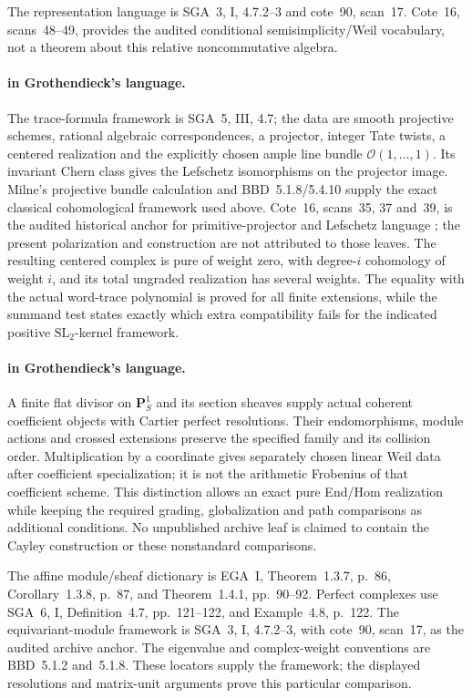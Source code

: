 The representation language is SGA~3, I, 4.7.2--3 and
cote~90, scan~17. Cote~16, scans~48--49, provides the
audited conditional semisimplicity/Weil vocabulary, not
a theorem about this relative noncommutative algebra.



\paragraph{ in Grothendieck's language.}
The trace-formula framework is SGA~5, III, 4.7; the data
are smooth projective schemes, rational algebraic
correspondences, a projector, integer Tate twists, a centered
realization and the explicitly chosen ample line bundle
$\mathcal O(1,\ldots,1)$. Its invariant Chern class gives the
Lefschetz isomorphisms on the projector image. Milne's projective
bundle calculation and BBD~5.1.8/5.4.10 supply the exact classical
cohomological framework used above. Cote~16, scans~35, 37 and~39,
is the audited historical anchor for primitive-projector and
Lefschetz language \cite{Archive}; the present polarization and
construction are not attributed to those leaves.
The resulting centered complex is pure of weight zero, with
degree-$i$ cohomology of weight $i$, and its total ungraded
realization has several weights. The equality with the actual
word-trace polynomial is proved for all finite extensions, while
the summand test states exactly which extra compatibility fails
for the indicated positive $\mathrm{SL}_2$-kernel framework.


\paragraph{ in Grothendieck's language.}
A finite flat divisor on $\mathbf P^1_S$ and its section
sheaves supply actual coherent coefficient objects with
Cartier perfect resolutions. Their endomorphisms, module
actions and crossed extensions preserve the specified
family and its collision order. Multiplication by a
coordinate gives separately chosen linear Weil data after
coefficient specialization; it is not the arithmetic
Frobenius of that coefficient scheme. This distinction
allows an exact pure End/Hom realization while keeping the
required grading, globalization and path comparisons as
additional conditions. No unpublished archive leaf is
claimed to contain the Cayley construction or these
nonstandard comparisons.

The affine module/sheaf dictionary is EGA~I, Theorem~1.3.7,
p.~86, Corollary~1.3.8, p.~87, and Theorem~1.4.1,
pp.~90--92. Perfect complexes use SGA~6, I, Definition~4.7,
pp.~121--122, and Example~4.8, p.~122. The equivariant-module
framework is SGA~3, I, 4.7.2--3, with cote~90, scan~17,
as the audited archive anchor. The eigenvalue and complex-weight
conventions are BBD~5.1.2 and~5.1.8. These locators supply
the framework; the displayed resolutions and matrix-unit
arguments prove this particular comparison.

